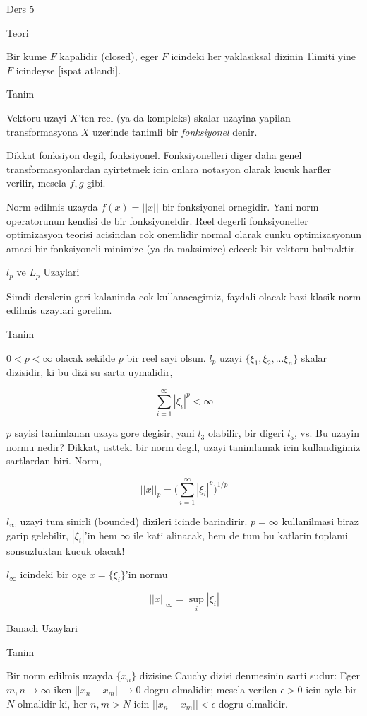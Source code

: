 \documentclass[12pt,fleqn]{article}\usepackage{../common}
\begin{document}
Ders 5

Teori 

Bir kume $F$ kapalidir (closed), eger $F$ icindeki her yaklasiksal dizinin
1limiti yine $F$ icindeyse [ispat atlandi]. 

Tanim 

Vektoru uzayi $X$'ten reel (ya da kompleks) skalar uzayina yapilan
transformasyona $X$ uzerinde tanimli bir {\em fonksiyonel} denir. 

Dikkat fonksiyon degil, fonksiyonel. Fonksiyonelleri diger daha genel
transformasyonlardan ayirtetmek icin onlara notasyon olarak kucuk harfler
verilir, mesela $f,g$ gibi. 

Norm edilmis uzayda $f(x) = ||x||$ bir fonksiyonel ornegidir. Yani norm
operatorunun kendisi de bir fonksiyoneldir. Reel degerli fonksiyoneller
optimizasyon teorisi acisindan cok onemlidir normal olarak cunku
optimizasyonun amaci bir fonksiyoneli minimize (ya da maksimize) edecek bir
vektoru bulmaktir. 

$l_p$ ve $L_p$ Uzaylari 

Simdi derslerin geri kalaninda cok kullanacagimiz, faydali olacak bazi
klasik norm edilmis uzaylari gorelim. 

Tanim 

$0 < p < \infty$ olacak sekilde $p$ bir reel sayi olsun. $l_p$ uzayi $\{
\xi_1,\xi_2,...\xi_n\}$ 
skalar dizisidir, ki bu dizi su sarta uymalidir,

\[ \sum_{i=1}^{\infty} |\xi_i|^p < \infty \]

$p$ sayisi tanimlanan uzaya gore degisir, yani $l_3$ olabilir, bir digeri
$l_5$, vs. Bu uzayin normu nedir? Dikkat, ustteki bir norm degil, uzayi
tanimlamak icin kullandigimiz sartlardan biri. Norm, 

\[ ||x||_p = \bigg( \sum_{i=1}^\infty |\xi_i|^p \bigg)^{1/p}  \]

$l_\infty$ uzayi tum sinirli (bounded) dizileri icinde barindirir. $p =
\infty$ kullanilmasi
biraz garip gelebilir, $|\xi_i|$'in hem $\infty$ ile kati alinacak, hem de tum bu katlarin toplami 
sonsuzluktan kucuk olacak! 

$l_\infty$ icindeki bir oge $x = \{ \xi_i \}$'in normu 

\[ ||x||_\infty = \sup_i |\xi_i| \]

Banach Uzaylari 

Tanim

Bir norm edilmis uzayda $\{x_n\}$ dizisine Cauchy dizisi denmesinin sarti sudur:
Eger $m,n
\to \infty$ iken $||x_n - x_m|| \to 0$ dogru olmalidir; mesela verilen $\epsilon > 0$
icin oyle  bir $N$ olmalidir ki, her $n,m > N$ icin $||x_n - x_m|| < \epsilon$ dogru
olmalidir.
\end{document}
